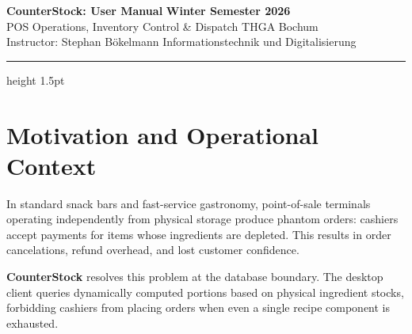 \documentclass[11pt,a4paper]{article}
\begin{document}
\noindent
{\LARGE\textbf{\color{thgablue}CounterStock: User Manual}} \hfill {\large\textbf{\color{thgared}Winter Semester 2026}}\\[0.2cm]
{\small POS Operations, Inventory Control \& Dispatch} \hfill {\small THGA Bochum}\\
{\small Instructor: Stephan B\"okelmann} \hfill {\small Informationstechnik und Digitalisierung}\\[0.25cm]
{\color{thgablue}\hrule height 1.5pt}

\vspace*{\fill}

\begin{center}
\parbox{0.92\textwidth}{
  \renewcommand{\contentsname}{\centering\LARGE\color{thgablue}Table of Contents}
  \tableofcontents
}
\end{center}

\vspace{1.2cm}
\noindent{}

\vspace*{\fill}

\newpage

\section{Motivation and Operational Context}
In standard snack bars and fast-service gastronomy, point-of-sale terminals operating independently from physical storage produce phantom orders: cashiers accept payments for items whose ingredients are depleted. This results in order cancelations, refund overhead, and lost customer confidence.

\textbf{\color{thgared}CounterStock} resolves this problem at the database boundary. The desktop client queries dynamically computed portions based on physical ingredient stocks, forbidding cashiers from placing orders when even a single recipe component is exhausted.

\vspace{0.3cm}
\noindent{}
\vspace{0.3cm}
\end{document}
